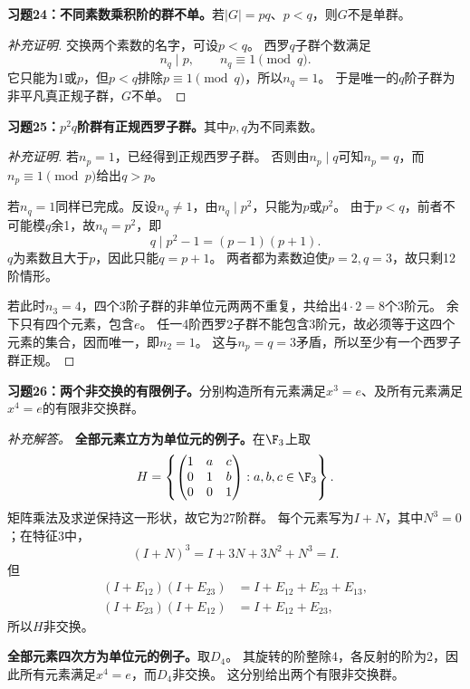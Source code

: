 \begin{problem}
\textbf{习题24：不同素数乘积阶的群不单。}若$|G|=pq$、$p<q$，则$G$不是单群。
\end{problem}
\begin{proof}[补充证明]
交换两个素数的名字，可设$p<q$。
西罗$q$子群个数满足
\[
n_q\mid p,\qquad n_q\equiv1\pmod q.
\]
它只能为1或$p$，但$p<q$排除$p\equiv1\pmod q$，所以$n_q=1$。
于是唯一的$q$阶子群为非平凡真正规子群，$G$不单。
\end{proof}

\begin{problem}
\textbf{习题25：$p^2q$阶群有正规西罗子群。}其中$p,q$为不同素数。
\end{problem}
\begin{proof}[补充证明]
若$n_p=1$，已经得到正规西罗子群。
否则由$n_p\mid q$可知$n_p=q$，而$n_p\equiv1\pmod p$给出$q>p$。

若$n_q=1$同样已完成。反设$n_q\neq1$，由$n_q\mid p^2$，只能为$p$或$p^2$。
由于$p<q$，前者不可能模$q$余1，故$n_q=p^2$，即
\[
q\mid p^2-1=(p-1)(p+1).
\]
$q$为素数且大于$p$，因此只能$q=p+1$。
两者都为素数迫使$p=2,q=3$，故只剩12阶情形。

若此时$n_3=4$，四个3阶子群的非单位元两两不重复，共给出$4\cdot2=8$个3阶元。
余下只有四个元素，包含$e$。
任一4阶西罗2子群不能包含3阶元，故必须等于这四个元素的集合，因而唯一，即$n_2=1$。
这与$n_p=q=3$矛盾，所以至少有一个西罗子群正规。
\end{proof}

\begin{problem}
\textbf{习题26：两个非交换的有限例子。}分别构造所有元素满足$x^3=e$、及所有元素满足$x^4=e$的有限非交换群。
\end{problem}
\begin{solution}
\textit{补充解答。}
\textbf{全部元素立方为单位元的例子。}在$\F_3$上取
\[
H=\left\{\begin{pmatrix}1&a&c\\0&1&b\\0&0&1\end{pmatrix}:a,b,c\in\F_3\right\}.
\]
矩阵乘法及求逆保持这一形状，故它为27阶群。
每个元素写为$I+N$，其中$N^3=0$；在特征3中，
\[
(I+N)^3=I+3N+3N^2+N^3=I.
\]
但
\begin{align*}
(I+E_{12})(I+E_{23})&=I+E_{12}+E_{23}+E_{13},\\
(I+E_{23})(I+E_{12})&=I+E_{12}+E_{23},
\end{align*}
所以$H$非交换。

\textbf{全部元素四次方为单位元的例子。}取$D_4$。
其旋转的阶整除4，各反射的阶为2，因此所有元素满足$x^4=e$，而$D_4$非交换。
这分别给出两个有限非交换群。
\end{solution}

